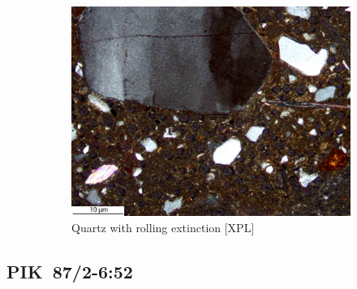 \documentclass[a4paper]{article}
\begin{document}
\begin{figure}[H]
\begin{subfigure}[t]{.32\textwidth}
		\includegraphics[width=\textwidth]{ThinSections/98-5_20x_XPL.jpg}
		\caption{Quartz with rolling extinction [XPL]}
	\end{subfigure}
	\caption{}
	\label{fig:98_pik}
\end{figure}

\newpage\subsection{PIK~87/2-6:52 \citep[pik\#97; Fig.~\ref{fig:pik.pottery}.11; cf. modern;][430 Pl.~49.5]{Seidensticker.2021e}}
\end{document}
